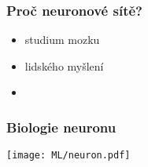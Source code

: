 \documentclass[red,professionalfont]{beamer}
\theoremstyle{definition}
\newcommand{\0}{\mbox{${\bf 0}$}}
\begin{document}
\begin{frame}\frametitle{Proč neuronové sítě?}
\begin{itemize}
 \item studium mozku\pause
 \item lidského myšlení\pause
 \item {}
\end{itemize}
\end{frame}

\begin{frame}\frametitle{Biologie neuronu}
\begin{center}
 \texttt{[image: ML/neuron.pdf]}
\end{center}
% 
\end{frame}
\end{document}
